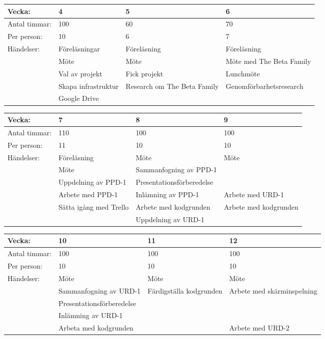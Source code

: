   \begin{tabular}{ | p{65pt} || p{110pt} | p{110pt} | p{110pt} |}
    \hline
    Vecka: & 4 & 5 & 6 \\ \hline
    Antal timmar: & 100 & 60 & 70 \\ \hline
    Per person: & 10 & 6 & 7 \\ \hline
    Händelser: & Föreläsningar & Föreläsning & Föreläsning \\ \hline
    & Möte & Möte & Möte med The Beta Family  \\ \hline
    & Val av projekt & Fick projekt & Lunchmöte\\ \hline
    & Skapa infrastruktur & Research om The Beta Family & Genomförbarhetsresearch\\ \hline
    & Google Drive &  & \\ \hline
    \end{tabular}

    \begin{tabular}{ | p{65pt} || p{110pt} | p{110pt} | p{110pt} |}
    \hline
    Vecka: & 7 & 8 & 9  \\ \hline
    Antal timmar: & 110 & 100 & 100\\ \hline
    Per person: & 11 & 10 & 10\\ \hline
    Händelser: & Föreläsning & Möte & Möte\\ \hline
    & Möte & Sammanfogning av PPD-1 &\\ \hline
    & Uppdelning av PPD-1 & Presentationsförberedelse &  \\ \hline
    & Arbete med PPD-1 & Inlämning av PPD-1 & Arbete med URD-1 \\ \hline
    & Sätta igång med Trello & Arbete med kodgrunden & Arbete med kodgrunden \\ \hline
    & & Uppdelning av URD-1 & \\ \hline
    \end{tabular}

    \begin{tabular}{ | p{65pt} || p{110pt} | p{110pt} | p{110pt} |}
    \hline
    Vecka: & 10 & 11 & 12  \\ \hline
    Antal timmar: & 100 & 100 & 100 \\ \hline
    Per person: & 10 & 10 & 10 \\ \hline
    Händelser: & Möte & Möte & Möte\\ \hline
    & Sammanfogning av URD-1 & Färdigställa kodgrunden & Arbete med skärminspelning\\ \hline
    & Presentationsförberedelse &  &  \\ \hline
    & Inlämning av URD-1 &  &  \\ \hline
    & Arbeta med kodgrunden &  & Arbete med URD-2 \\ \hline
    \end{tabular}

